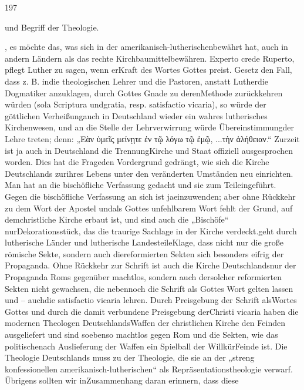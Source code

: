 197\n\n\begin{center}\nWesen und Begriff der Theologie.\n\end{center}\n\nnahelegen, es möchte das, was sich in der amerikanisch-lutherischen\nKirche bewährt hat, auch in andern Ländern als das rechte Kirchbaumittel\nsich bewähren. Experto crede Ruperto, pflegt Luther zu sagen, wenn er\ndie Kraft des Wortes Gottes preist. Gesetz den Fall, dass z. B. in\nDeutschland die theologischen Lehrer und die Pastoren, anstatt Luther\nund die Dogmatiker anzuklagen, durch Gottes Gnade zu deren\ntheologischer Methode zurückkehren würden (sola Scriptura und\nsola gratia, resp. satisfactio vicaria), so würde der göttlichen Verheißung auch in Deutschland wieder ein wahres lutherisches Kirchenwesen\nentstehen, und an die Stelle der Lehrverwirrung würde Übereinstimmung\nin der Lehre treten; denn: „Εὰν ὑμεῖς μείνῃτε ἐν τῷ λόγω τῷ ἐμῷ, ... τὴν ἀλήθειαν.“ Zurzeit ist ja auch in Deutschland die Trennung\nvon Kirche und Staat offiziell ausgesprochen worden. Dies hat die Frage\nin den Vordergrund gedrängt, wie sich die Kirche Deutschlands zur\nSicherung ihres Lebens unter den veränderten Umständen neu einrichten\nhabe. Man hat an die bischöfliche Verfassung gedacht und sie zum Teil\nbereits eingeführt. Gegen die bischöfliche Verfassung an sich ist ja\nnichts einzuwenden; aber ohne Rückkehr zu dem Wort der Apostel und\nPropheten als Gottes unfehlbarem Wort fehlt der Grund, auf dem\ndie christliche Kirche erbaut ist, und sind auch die „Bischöfe“ nur\nein Dekorationsstück, das die traurige Sachlage in der Kirche verdeckt. geht durch lutherische Länder und lutherische Landesteile\ndie Klage, dass nicht nur die große römische Sekte, sondern auch die\nverschiedenen reformierten Sekten sich besonders eifrig der Propaganda\nwidmen. Ohne Rückkehr zur Schrift ist auch die Kirche Deutschlands\nnicht nur der Propaganda Roms gegenüber machtlos, sondern auch der\nPropaganda solcher reformierten Sekten nicht gewachsen, die neben noch die Schrift als Gottes Wort gelten lassen und – auch\nnoch die satisfactio vicaria lehren. Durch Preisgebung der Schrift als\ndes Wortes Gottes und durch die damit verbundene Preisgebung der\nsatisfactio Christi vicaria haben die modernen Theologen Deutschlands\ndie Waffen der christlichen Kirche den Feinden ausgeliefert und sind so\nipso ebenso machtlos gegen Rom und die Sekten, wie das politische\nDeutschland nach Auslieferung der Waffen ein Spielball der Willkür\nseiner Feinde ist. Die Theologie Deutschlands muss zu der Theologie, die sie an der „streng konfessionellen amerikanisch-lutherischen\nKirche“ als Repräsentationstheologie verwarf. Übrigens sollten wir in\ndiesem Zusammenhang daran erinnern, dass diese